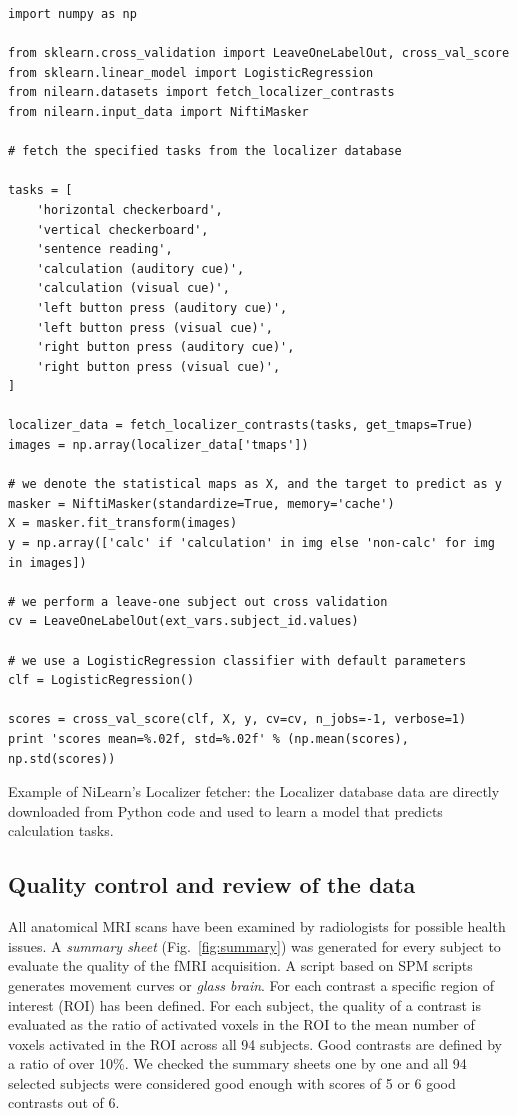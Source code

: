 \documentclass[preprint,12pt]{elsarticle}
\begin{document}
\begin{listing}[H]
\begin{verbatim}
import numpy as np

from sklearn.cross_validation import LeaveOneLabelOut, cross_val_score
from sklearn.linear_model import LogisticRegression
from nilearn.datasets import fetch_localizer_contrasts
from nilearn.input_data import NiftiMasker

# fetch the specified tasks from the localizer database

tasks = [
    'horizontal checkerboard',
    'vertical checkerboard',
    'sentence reading',
    'calculation (auditory cue)',
    'calculation (visual cue)',
    'left button press (auditory cue)',
    'left button press (visual cue)',
    'right button press (auditory cue)',
    'right button press (visual cue)',
]

localizer_data = fetch_localizer_contrasts(tasks, get_tmaps=True)
images = np.array(localizer_data['tmaps'])

# we denote the statistical maps as X, and the target to predict as y
masker = NiftiMasker(standardize=True, memory='cache')
X = masker.fit_transform(images)
y = np.array(['calc' if 'calculation' in img else 'non-calc' for img in images])

# we perform a leave-one subject out cross validation
cv = LeaveOneLabelOut(ext_vars.subject_id.values)

# we use a LogisticRegression classifier with default parameters
clf = LogisticRegression()

scores = cross_val_score(clf, X, y, cv=cv, n_jobs=-1, verbose=1)
print 'scores mean=%.02f, std=%.02f' % (np.mean(scores), np.std(scores))
\end{verbatim}
\caption{Example of NiLearn's Localizer fetcher: the Localizer database data are directly downloaded from Python code and used to learn a model that predicts calculation tasks.}
\label{code:NiLearn}
\end{listing}

\subsection{Quality control and review of the data}

All anatomical MRI scans have been examined by radiologists for possible health issues. A \emph{summary sheet} (Fig.~\ref{fig:summary}) was generated for every subject to evaluate the quality of the fMRI acquisition. A script based on SPM scripts generates movement curves or \textit{glass brain}. For each contrast a specific region of interest (ROI) has been defined. For each subject, the quality of a contrast is evaluated as the ratio of activated voxels in the ROI to the mean number of voxels activated in the ROI across all 94 subjects. Good contrasts are defined by a ratio of over 10\%. We checked the summary sheets one by one and all 94 selected subjects were considered good enough with scores of 5 or 6 good contrasts out of 6.
\end{document}
